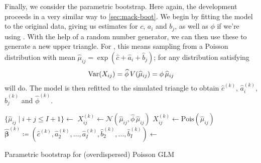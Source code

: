 \documentclass[a4paper]{book}
\begin{document}
Finally, we consider the parametric bootstrap. Here again, the development proceeds in a very similar way to \cref{sec:mack-boot}. We begin by fitting the model to the original data, giving us estimates for $c$, $a_i$ and $b_j$, as well as $\phi$ if we're using . With the help of a random number generator, we can then use these to generate a new upper triangle. For , this means sampling from a Poisson distribution with mean $\widehat{\mu}_{ij} = \exp{( \widehat{c} + \widehat{a}_i + \widehat{b}_j )}$; for  any distribution satisfying
\begin{equation}
  \var{X_{ij}} = \widehat{\phi} \, V(\widehat{\mu}_{ij}) = \phi \, \widehat{\mu}_{ij}
\end{equation}
will do. The model is then refitted to the simulated triangle to obtain $\widehat{c}^{(k)}$, $\widehat{a}^{(k)}_i$, $\widehat{b}^{(k)}_j$ and $\widehat{\phi}^{(k)}$.

\begin{algorithm}
  \begin{algorithmic}
    \State $\{\widehat{\mu}_{ij} \mid i + j \leq I + 1 \} \gets$ 
            \State $X_{ij}^{(k)} \gets \mathcal{N}(\widehat{\mu}_{ij}, \widehat{\phi} \, \widehat{\mu}_{ij})$
          \Else
            \State $X_{ij}^{(k)} \gets \mathrm{Pois}(\widehat{\mu}_{ij})$
          \EndIf
        \EndFor
      \EndFor
      \State $\widehat{\bm{\beta}}^{(k)} \coloneqq (\widehat{c}^{(k)}, \widehat{a}_2^{(k)}, \dots, \widehat{a}_I^{(k)}, \widehat{b}_2^{(k)}, \dots, \widehat{b}_I^{(k)}) \gets$ 
    \EndFor
    \State {}
  \end{algorithmic}
  \caption{Parametric bootstrap for (overdispersed) Poisson GLM}
  \label{alg:param-pois}
\end{algorithm}
\end{document}
